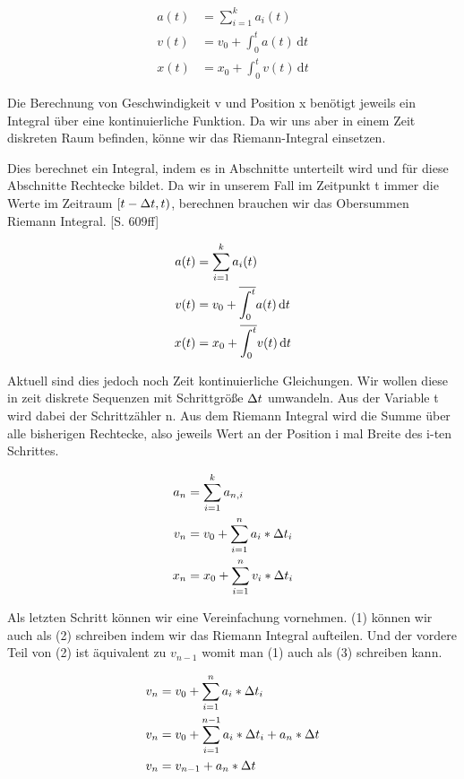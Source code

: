 \begin{align*}
  a(t) &= \sum_{i=1}^{k}{a_i(t)}  \\
  v(t) &= v_0 + \int_0^t {a(t)}\,\mathrm{d}t  \\
  x(t) &= x_0 + \int_0^t {v(t)}\,\mathrm{d}t
\end{align*}

Die Berechnung von Geschwindigkeit v und Position x benötigt jeweils ein Integral über eine kontinuierliche Funktion. Da wir uns aber in einem Zeit diskreten Raum befinden, könne wir das Riemann-Integral einsetzen\cite{RINT}.


Dies berechnet ein Integral, indem es in Abschnitte unterteilt wird und für diese Abschnitte Rechtecke bildet. Da wir in unserem Fall im Zeitpunkt t immer die Werte im Zeitraum $[t - \Delta t , t)$, berechnen brauchen wir das Obersummen Riemann Integral. \cite{EMFGAIA}[S. 609ff]

\begin{align*}
  a(t) &= \sum_{i=1}^{k}{a_i(t)}  \\
  v(t) &= v_0 + \overline{\int_{0}^{t}} a(t)\,\mathrm{d}t  \\
  x(t) &= x_0 + \overline{\int_{0}^{t}} v(t)\,\mathrm{d}t
\end{align*}

Aktuell sind dies jedoch noch Zeit kontinuierliche Gleichungen. Wir wollen diese in zeit diskrete Sequenzen mit Schrittgröße $\Delta t$ umwandeln. Aus der Variable t wird dabei der Schrittzähler n. Aus dem Riemann Integral wird die Summe über alle bisherigen Rechtecke, also jeweils Wert an der Position i mal Breite des i-ten Schrittes.

\begin{align*}
  a_n &= \sum_{i=1}^{k}{a_{n, i}}  \\
  v_n &= v_0 + \sum_{i=1}^{n}{a_i * \Delta t_i}  \\
  x_n &= x_0 + \sum_{i=1}^{n}{v_i * \Delta t_i}
\end{align*}

Als letzten Schritt können wir eine Vereinfachung vornehmen. (1) können wir auch als (2) schreiben indem wir das Riemann Integral aufteilen. Und der vordere Teil von (2) ist äquivalent zu $v_{n-1}$ womit man (1) auch als (3) schreiben kann. 

\begin{align}
  v_n &= v_0 + \sum_{i=1}^{n}{a_i * \Delta t_i}  \\
  v_n &= v_0 + \sum_{i=1}^{n-1}{a_i * \Delta t_i} + a_n * \Delta t  \\
  v_n &= v_{n-1} + a_n * \Delta t
\end{align}

